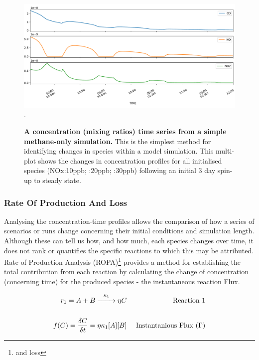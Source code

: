 \begin{figure}[H]
     \centering
         \includegraphics[width=.85\textwidth]{figures/ch2concentration.pdf}\\
         .
        \caption{\textbf{A concentration (mixing ratios) time series from a simple methane-only simulation.} This is the simplest method for identifying changes in species within a model simulation. This multi-plot shows the changes in concentration profiles for all initialised species (NOx:10ppb; :20ppb; :30ppb) following an initial 3 day spin-up to steady state. }
        \label{fig:concentration}
\end{figure}

\subsubsection{Rate Of Production And Loss}\label{sec:ropa}

Analysing the concentration-time profiles allows the comparison of how a series of scenarios or runs change concerning their initial conditions and simulation length. Although these can tell us how, and how much, each species changes over time, it does not rank or quantifies the specific reactions to which this may be attributed. Rate of Production Analysis (ROPA)\footnote{and loss} provides a method for establishing the total contribution from each reaction by calculating the change of concentration (concerning time) for the produced species - the instantaneous reaction Flux.

\begin{eqnarray}
  r_1 = A + B \overset{\kappa_1}{\xrightarrow{\hspace*{7mm}}} \eta C & & \text{ Reaction 1}\\[15pt]
  f(C) = \dfrac{\delta C}{\delta t} =  \eta  \kappa_1 [A][B]                     & & \text{ Instantanious Flux }(\Gamma) \label{eqn:ode}
\end{eqnarray}

